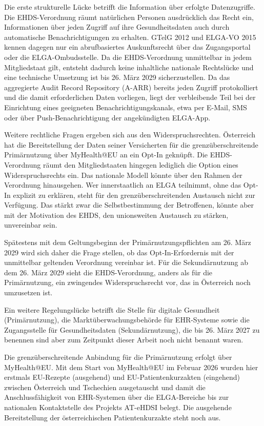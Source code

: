 Die erste strukturelle Lücke betrifft die Information über erfolgte Datenzugriffe. Die EHDS-Verordnung räumt natürlichen Personen ausdrücklich das Recht ein, Informationen über jeden Zugriff auf ihre Gesundheitsdaten auch durch automatische Benachrichtigungen zu erhalten. GTelG 2012 und ELGA-VO 2015 kennen dagegen nur ein abrufbasiertes Auskunftsrecht über das Zugangsportal oder die ELGA-Ombudsstelle. Da die EHDS-Verordnung unmittelbar in jedem Mitgliedstaat gilt, entsteht dadurch keine inhaltliche nationale Rechtslücke und eine technische Umsetzung ist bis 26. März 2029 sicherzustellen. Da das aggregierte Audit Record Repository (A-ARR) bereits jeden Zugriff protokolliert und die damit erforderlichen Daten vorliegen, liegt der verbleibende Teil bei der Einrichtung eines geeigneten Benachrichtigungskanals, etwa per E-Mail, SMS oder über Push-Benachrichtigung der angekündigten ELGA-App.

Weitere rechtliche Fragen ergeben sich aus den Widerspruchsrechten. Österreich hat die Bereitstellung der Daten seiner Versicherten für die grenzüberschreitende Primärnutzung über MyHealth@EU an ein Opt-In geknüpft. Die EHDS-Verordnung räumt den Mitgliedstaaten hingegen lediglich die Option eines Widerspruchsrechts ein. Das nationale Modell könnte über den Rahmen der Verordnung hinausgehen. Wer innerstaatlich an ELGA teilnimmt, ohne das Opt-In explizit zu erklären, steht für den grenzüberschreitenden Austausch nicht zur Verfügung. Das stärkt zwar die Selbstbestimmung der Betroffenen, könnte aber mit der Motivation des EHDS, den unionsweiten Austausch zu stärken, unvereinbar sein.

Spätestens mit dem Geltungsbeginn der Primärnutzungspflichten am 26. März 2029 wird sich daher die Frage stellen, ob das Opt-In-Erfordernis mit der unmittelbar geltenden Verordnung vereinbar ist. Für die Sekundärnutzung ab dem 26. März 2029 sieht die EHDS-Verordnung, anders als für die Primärnutzung, ein zwingendes Widerspruchsrecht vor, das in Österreich noch umzusetzen ist.

Ein weitere Regelungslücke betrifft die Stelle für digitale Gesundheit (Primärnutzung), die Marktüberwachungsbehörde für EHR-Systeme sowie die Zugangsstelle für Gesundheitsdaten (Sekundärnutzung), die bis 26. März 2027 zu benennen sind aber zum Zeitpunkt dieser Arbeit noch nicht benannt waren.

Die grenzüberschreitende Anbindung für die Primärnutzung erfolgt über MyHealth@EU. Mit dem Start von MyHealth@EU im Februar 2026 wurden hier erstmals EU-Rezepte (ausgehend) und EU-Patientenkurzakten (eingehend) zwischen Österreich und Tschechien ausgetauscht und damit die Anschlussfähigkeit von EHR-Systemen über die ELGA-Bereiche bis zur nationalen Kontaktstelle des Projekts AT-eHDSI belegt.
Die ausgehende Bereitstellung der österreichischen Patientenkurzakte steht noch aus.

